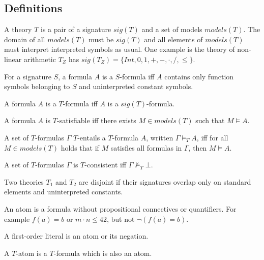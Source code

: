 \subsection{Definitions}
\begin{mytitle}[Theory] A theory $T$ is a pair of a signature $sig(T)$ and a set of models $models(T)$. The domain of all $models(T)$ must be $sig(T)$ and all elements of $models(T)$ must interpret interpreted symbols as usual. One example is the theory of non-linear arithmetic $T_Z$ has $sig(T_Z)=\{Int, 0, 1, +, -, \cdot, /, \le\}$.
\end{mytitle}
\begin{mytitle}[$S$-formula] For a signature $S$, a formula $A$ is a $S$-formula iff $A$ contains only function symbols belonging to $S$ and uninterpreted constant symbols.
\end{mytitle}
\begin{mytitle}[$T$-formula] A formula $A$ is a $T$-formula iff $A$ is a $sig(T)$-formula.
\end{mytitle}
\begin{mytitle}[$T$-satisfiability] A formula $A$ is $T$-satisfiable iff there exists $M\in models(T)$ such that $M\models A$.
\end{mytitle}
\begin{mytitle}[$T$-entailment] A set of $T$-formulas $\Gamma$ $T$-entails a $T$-formula $A$, written $\Gamma \models_T A$, iff for all $M\in models(T)$ holds that if $M$ satisfies all formulas in $\Gamma$, then $M\models A$.
\end{mytitle}
\begin{mytitle}[$T$-consistency] A set of $T$-formulas $\Gamma$ is $T$-consistent iff $\Gamma \not\models_T \bot$.
\end{mytitle}
\begin{mytitle}[Disjointedness] Two theories $T_1$ and $T_2$ are disjoint if their signatures overlap only on standard elements and uninterpreted constants.
\end{mytitle}
\begin{mytitle}[Atom] An atom is a formula without propositional connectives or quantifiers. For example $f(a) = b$ or $m\cdot n \le 42$, but not $\lnot(f(a)=b)$.
\end{mytitle}
\begin{mytitle} A first-order literal is an atom or its negation.
\end{mytitle}
\begin{mytitle}[$T$-atom] A $T$-atom is a $T$-formula which is also an atom. 
\end{mytitle}
